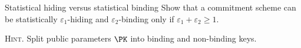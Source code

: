 \documentclass{crypto-exercise}
\author[Folclore result]{Sven Laur}
\theoremstyle{plain}\newtheorem{stmt}{Statement}
\begin{document}
\begin{exercise}{Statistical hiding versus statistical binding} 
Show  that a commitment scheme can be statistically $\varepsilon_1$-hiding and $\varepsilon_2$-binding only if $\varepsilon_1+\varepsilon_2\geq 1$.
\end{exercise}
\begin{solution}
\end{solution}
\textsc{Hint.} Split public parameters $\PK$ into binding and non-binding keys.
\end{document}
